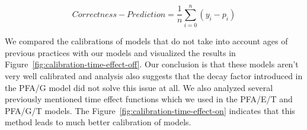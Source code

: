 \begin{equation} \label{eq-callibration}
  \mathit{Correctness} - \mathit{Prediction} = \frac{1}{n} \sum_{i=0}^{n} (y_i - p_i)
\end{equation}

We compared the calibrations of models that do not take into account ages of previous practices with our models and visualized the results in Figure~\ref{fig:calibration-time-effect-off}. Our conclusion is that these models aren't very well calibrated and analysis also suggests that the decay factor introduced in the PFA/G model did not solve this issue at all. We also analyzed several previously mentioned time effect functions which we used in the PFA/E/T and PFA/G/T models. The Figure~\ref{fig:calibration-time-effect-on} indicates that this method leads to much better calibration of models.

